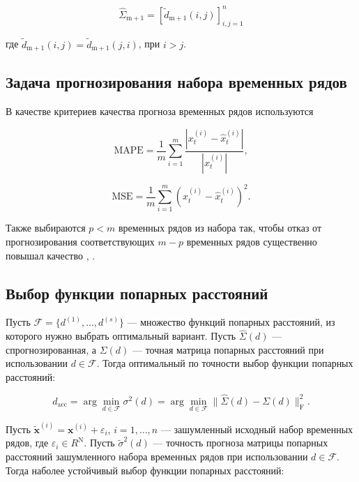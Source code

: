 \documentclass{article}
\begin{document}
\begin{equation}
    \hat{\Sigma}_{\text{m} + 1} = [\widetilde{d}_{\text{m} + 1}(i, j)]_{i, j = 1}^{n}
\end{equation}

где $\widetilde{d}_{\text{m} + 1}(i, j) = \widetilde{d}_{\text{m} + 1}(j, i)$, при $i > j$.

\subsection{Задача прогнозирования набора временных рядов}

В качестве критериев качества прогноза временных рядов используются 

\begin{equation}
    \text{MAPE} = \frac{1}{m}\sum\limits_{i = 1}^{m}\dfrac{|x^{(i)}_t - \hat{x}^{(i)}_t|}{|x^{(i)}_t|},
\end{equation}

\begin{equation}
    \text{MSE} = \frac{1}{m}\sum\limits_{i = 1}^{m}(x^{(i)}_t - \hat{x}^{(i)}_t)^2.
\end{equation}

Также выбираются $p < m$ временных рядов из набора так, чтобы отказ от прогнозирования соответствующих $m - p$ временных рядов существенно повышал качество , . 

\subsection{Выбор функции попарных расстояний}

Пусть $\mathcal{F} = \{d^{(1)}, \ldots, d^{(s)}\}$ --- множество функций попарных расстояний, из которого нужно выбрать оптимальный вариант. Пусть $\hat{\Sigma}(d)$ --- спрогнозированная, а $\Sigma(d)$ --- точная матрица попарных расстояний при использовании $d \in \mathcal{F}$. Тогда оптимальный по точности выбор функции попарных расстояний:

\begin{equation}
    d_{\text{acc}} = \arg\min\limits_{d \in \mathcal{F}} \sigma^2(d) = \arg\min\limits_{d \in \mathcal{F}} \|\hat{\Sigma}(d) - \Sigma(d)\|_{\text{F}}^2.
\end{equation}

Пусть $\widetilde{\mathbf{x}}^{(i)} = \mathbf{x}^{(i)} + \varepsilon_i$, $i = 1, \ldots, n$ --- зашумленный исходный набор временных рядов, где $\varepsilon_i \in R^\text{N}$. Пусть $\widetilde{\sigma}^2(d)$ --- точность прогноза матрицы попарных расстояний зашумленного набора временных рядов при использовании $d \in \mathcal{F}$. Тогда наболее устойчивый выбор функции попарных расстояний:
\end{document}

